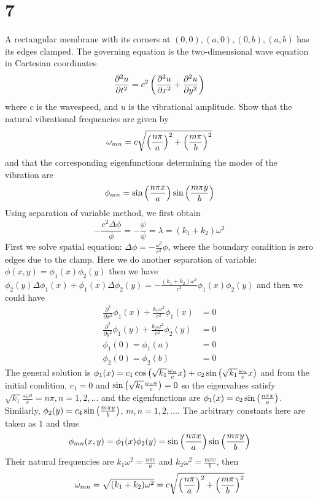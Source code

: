 \documentclass{article}
\begin{document}
\section*{7}

\begin{myleftlinebox}
    A rectangular membrane with its corners at \((0,0), (a,0), (0,b), (a,b)\) has its edges clamped. The governing equation is the two-dimensional wave equation in Cartesian coordinates
    \[\frac{\partial^2 u}{\partial t^2} = c^2\left( \frac{\partial^2 u}{\partial x^2}+\frac{\partial^2 u}{\partial y^2} \right)\]
    where \(c\) is the wavespeed, and \(u\) is the vibrational amplitude. Show that the natural vibrational frequencies are given by 
    \[\omega_{mn}=c\sqrt{\left( \frac{n\pi}{a} \right)^2+\left( \frac{m\pi}{b} \right)^2}\]
    and that the corresponding eigenfunctions determining the modes of the vibration are
    \[\phi_{mn}=\sin\left( \frac{n\pi x}{a} \right)\sin\left( \frac{m\pi y}{b} \right)\]
    \tcbline
    Using separation of variable method, we first obtain
    \[-\frac{c^2\Delta \phi}{\phi}=-\frac{\ddot\psi}{\psi}=\lambda=(k_1+k_2)\omega^2\]
    First we solve spatial equation: \(\Delta \phi=-\frac{\omega^2}{c^2} \phi\), where the boundary condition is zero edges due to the clamp.
    Here we do another separation of variable: \(\phi(x,y)=\phi_1(x)\phi_2(y)\) then we have \(\phi_2(y)\Delta\phi_1(x)+\phi_1(x)\Delta\phi_2(y)=-\frac{(k_1+k_2)\omega^2}{c^2}\phi_1(x)\phi_2(y)\) and then we could have
    \begin{align*}
        \frac{\partial^2}{\partial x^2}\phi_1(x)+\frac{k_1\omega^2}{c^2}\phi_1(x)&=0\\
        \frac{\partial^2}{\partial y^2}\phi_1(y)+\frac{k_2\omega^2}{c^2}\phi_2(y)&=0\\
        \phi_1(0)=\phi_1(a)&=0\\
        \phi_2(0)=\phi_2(b) &= 0
    \end{align*}
    The general solution is \(\phi_1(x)=c_1\cos\left( \sqrt{k_1}\frac{\omega_n}{c}x \right)+c_2\sin\left( \sqrt{k_1}\frac{\omega_n}{c}x \right)\) and from the initial condition, \(c_1=0\) and \(\sin\left( \sqrt{k_1}\frac{\omega_na}{c} \right)=0\) so the eigenvalues satisfy \(\sqrt{k_1}\frac{\omega_na}{c}=n\pi,n=1,2,\dots\) and the eigenfunctions are \(\phi_1(x)=c_2\sin\left( \frac{n\pi x}{a} \right)\). Similarly, \(\phi_2(y)=c_4\sin\left( \frac{m\pi y}{b} \right)\), \(m,n=1,2,\dots\). The arbitrary constants here are taken as \(1\) and thus
    \[\phi_{mn}(x,y)=\phi_1(x)\phi_2(y)=\sin\left( \frac{n\pi x}{a} \right)\sin\left( \frac{m\pi y}{b} \right)\]
    Their natural frequencies are \(k_1\omega^2=\frac{n\pi c}{a}\) and \(k_2\omega^2=\frac{m\pi c}{b}\), then
    \[\omega_{mn} = \sqrt{(k_1+k_2)\omega^2}=c\sqrt{\left( \frac{n\pi}{a} \right)^2+\left( \frac{m\pi}{b} \right)^2}\]
\end{myleftlinebox}
\end{document}
